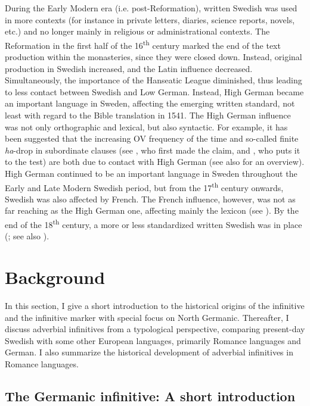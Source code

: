 \documentclass[output=paper]{langscibook}
\begin{document}
During the Early Modern era (i.e. post-Reformation), written Swedish was used in more contexts (for instance in private letters, diaries, science reports, novels, etc.) and no longer mainly in religious or administrational contexts. The Reformation in the first half of the 16\textsuperscript{th} century marked the end of the text production within the monasteries, since they were closed down. Instead, original production in Swedish increased, and the Latin influence decreased. Simultaneously, the importance of the Hanseatic League diminished, thus leading to less contact between Swedish and Low German. Instead, High German became an important language in Sweden, affecting the emerging written standard, not least with regard to the Bible translation in 1541. The High German influence was not only orthographic and lexical, but also syntactic. For example, it has been suggested that the increasing OV frequency of the time \citep{Petzell2011} and so-called finite \textit{ha}{}-drop in subordinate clauses (see \citealt{Johannisson1945}, who first made the claim, and \citealt{Backstrom2019}, who puts it to the test) are both due to contact with High German (see also \citealt{Braunmuller2005} for an overview). High German continued to be an important language in Sweden throughout the Early and Late Modern Swedish period, but from the 17\textsuperscript{th} century onwards, Swedish was also affected by French. The French influence, however, was not as far reaching as the High German one, affecting mainly the lexicon (see \citealt{Gellerstam2005}). By the end of the 18\textsuperscript{th} century, a more or less standardized written Swedish was in place (\citealt{Teleman2002}; see also ).


\section{Background}\label{sec:kalm:3}


In this section, I give a short introduction to the historical origins of the infinitive and the infinitive marker with special focus on North Germanic. Thereafter, I discuss adverbial infinitives from a typological perspective, comparing present-day Swedish with some other European languages, primarily Romance languages and German. I also summarize the historical development of adverbial infinitives in Romance languages. 


\subsection{The Germanic infinitive: A short introduction}\label{sec:kalm:3.1}
\end{document}
